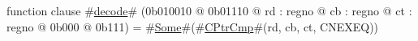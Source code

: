 function clause #\hyperref[zdecode]{decode}# (0b010010 @ 0b01110 @ rd : regno @ cb : regno @ ct : regno @ 0b000 @ 0b111) = #\hyperref[zSome]{Some}#(#\hyperref[zCPtrCmp]{CPtrCmp}#(rd, cb, ct, CNEXEQ))
